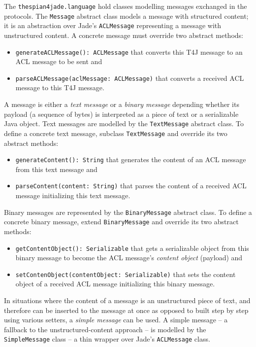 The \texttt{thespian4jade.language} hold classes modelling messages exchanged in the protocols.
The \texttt{Message} abstract class models a message with structured content; it is an abstraction over Jade's \texttt{ACLMessage} representing a message with unstructured content.
A concrete message must override two abstract methods:
\begin{itemize}
	\item \texttt{generateACLMessage(): ACLMessage} that converts this T4J message to an ACL message to be sent and
	\item \texttt{parseACLMessage(aclMessage: ACLMessage)} that converts a received ACL message to this T4J message.
\end{itemize}
A message is either a \textit{text message} or a \textit{binary message} depending whether its payload (a sequence of bytes) is interpreted as a piece of text or a serializable Java object.
Text messages are modelled by the \texttt{TextMessage} abstract class.
To define a concrete text message, subclass \texttt{TextMessage} and override its two abstract methods:
\begin{itemize}
	\item \texttt{generateContent(): String} that generates the content of an ACL message from this text message and
	\item \texttt{parseContent(content: String)} that parses the content of a received ACL message initializing this text message. 
\end{itemize}
Binary messages are represented by the \texttt{BinaryMessage} abstract class.
To define a concrete binary message, extend \texttt{BinaryMessage} and override its two abstract methods:
\begin{itemize}
	\item \texttt{getContentObject(): Serializable} that gets a serializable object from this binary message to become the ACL message's \textit{content object} (payload) and
	\item \texttt{setContenObject(contentObject: Serializable)} that sets the content object of a received ACL message initializing this binary message.
\end{itemize}

In situations where the content of a message is an unstructured piece of text, and therefore can be inserted to the message at once as opposed to built step by step using various setters, a \textit{simple message} can be used.
A simple message -- a fallback to the unstructured-content approach -- is modelled by the \texttt{SimpleMessage} class -- a thin wrapper over Jade's \texttt{ACLMessage} class.

